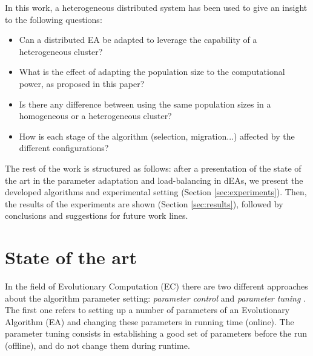 \documentclass[final,1p,times]{elsarticle}
\begin{document}
In this work, a heterogeneous distributed system has been used to give an insight to the following questions:
\begin{itemize}
 \item Can a distributed EA be adapted to leverage the capability of a heterogeneous cluster?
 \item What is the effect of adapting the population size to the computational power, as proposed in this paper? %
 \item Is there any difference between using the same population sizes in a homogeneous or a heterogeneous cluster?
 \item How is each stage of the algorithm (selection, migration...) affected by the different
   configurations? %
\end{itemize}


The rest of the work is structured as follows: after a presentation of
the state of
the art in the parameter adaptation and load-balancing in dEAs, %
 we present the developed algorithms and experimental setting (Section \ref{sec:experiments}). 
Then, the results of the experiments are shown (Section \ref{sec:results}), followed by conclusions and suggestions for future work lines.


%
\section{State of the art}
\label{sec:soa}
%

In the field of  Evolutionary Computation (EC) there are two different approaches about the algorithm parameter setting: {\em parameter control} and {\em parameter tuning} \cite{PARAMETERTUNING}. The first one refers to setting up a number of parameters of an Evolutionary Algorithm (EA) and changing these parameters in running time (online). The parameter tuning consists in establishing a good set of parameters before the run (offline), and do not change them during runtime.
\end{document}
